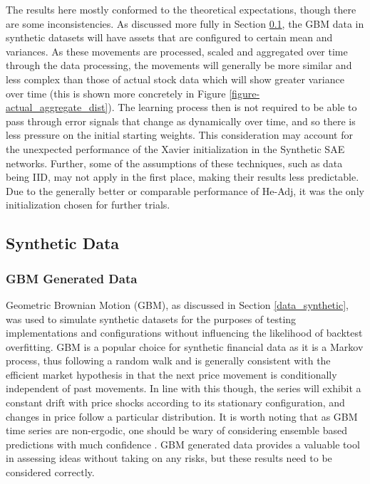 \documentclass[a4paper,11pt,oneside]{article}
\theoremstyle{plain}
\theoremstyle{definition}
\begin{document}
	The results here mostly conformed to the theoretical expectations, though there are some inconsistencies. As discussed more fully in Section \ref{results_synth}, the GBM data in synthetic datasets will have assets that are configured to certain mean and variances. As these movements are processed, scaled and aggregated over time through the data processing, the movements will generally be more similar and less complex than those of actual stock data which will show greater variance over time (this is shown more concretely in Figure \ref{figure-actual_aggregate_dist}). The learning process then is not required to be able to pass through error signals that change as dynamically over time, and so there is less pressure on the initial starting weights. This consideration may account for the unexpected performance of the Xavier initialization in the Synthetic SAE networks. Further, some of the assumptions of these techniques, such as data being IID, may not apply in the first place, making their results less predictable.  Due to the generally better or comparable performance of He-Adj, it was the only initialization chosen for further trials.  \newline
	
	\newpage
	\subsection{Synthetic Data}\label{results_synth}
	
	\subsubsection{GBM Generated Data}\label{results_gbm_data}
	
	Geometric Brownian Motion (GBM), as discussed in Section \ref{data_synthetic}, was used to simulate synthetic datasets for the purposes of testing implementations and configurations without influencing the likelihood of backtest overfitting. GBM is a popular choice for synthetic financial data as it is a Markov process, thus following a random walk and is generally consistent with the efficient market hypothesis in that the next price movement is conditionally independent of past movements. In line with this though, the series will exhibit a constant drift with price shocks according to its stationary configuration, and changes in price follow a particular distribution. It is worth noting that as GBM time series are non-ergodic, one should be wary of considering ensemble based predictions with much confidence \citep{Peters}. GBM generated data provides a valuable tool in assessing ideas without taking on any risks, but these results need to be considered correctly. \newline
	
\end{document}

